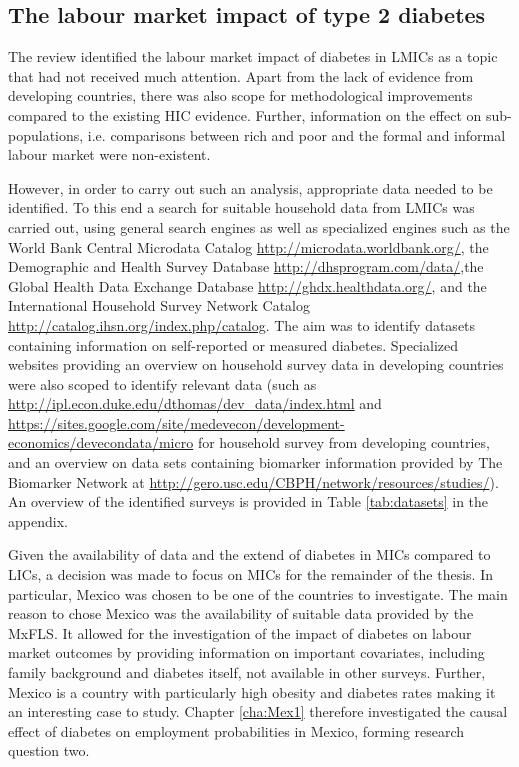 \subsection{The labour market impact of type 2 diabetes}

The review identified the labour market impact of diabetes in \acp{LMIC} as a topic that had not received much attention. Apart from the lack of evidence from developing countries, there was also scope for methodological improvements compared to the existing \ac{HIC} evidence. Further, information on the effect on sub-populations, i.e. comparisons between rich and poor and the formal and informal labour market were non-existent.

However, in order to carry out such an analysis, appropriate data needed to be identified. To this end a search for suitable household data from \acp{LMIC} was carried out, using general search engines as well as specialized engines such as the World Bank Central Microdata Catalog  \url{http://microdata.worldbank.org/}, the Demographic and Health Survey Database \url{http://dhsprogram.com/data/},the Global Health Data Exchange Database \url{http://ghdx.healthdata.org/}, and the International Household Survey Network Catalog \url{http://catalog.ihsn.org/index.php/catalog}. The aim was to identify datasets containing information on self-reported or measured diabetes. Specialized websites providing an overview on household survey data in developing countries were also scoped to identify relevant data (such as \url{http://ipl.econ.duke.edu/dthomas/dev_data/index.html} and \url{https://sites.google.com/site/medevecon/development-economics/devecondata/micro} for household survey from developing countries, and an overview on data sets containing biomarker information provided by The Biomarker Network at \url{http://gero.usc.edu/CBPH/network/resources/studies/}). An overview of the identified surveys is provided in Table \ref{tab:datasets} in the appendix.

Given the availability of data and the extend of diabetes in \acp{MIC} compared to \acp{LIC}, a decision was made to focus on \acp{MIC} for the remainder of the thesis. In particular, Mexico was chosen to be one of the countries to investigate. The main reason to chose Mexico was the availability of suitable  data provided by the \ac{MxFLS}. It allowed for the investigation of the impact of diabetes on labour market outcomes by providing information on important covariates, including family background and diabetes itself, not available in other surveys. Further, Mexico is a country with particularly high obesity and diabetes rates making it an interesting case to study. Chapter \ref{cha:Mex1} therefore investigated the causal effect of diabetes on employment probabilities in Mexico, forming research question two.

